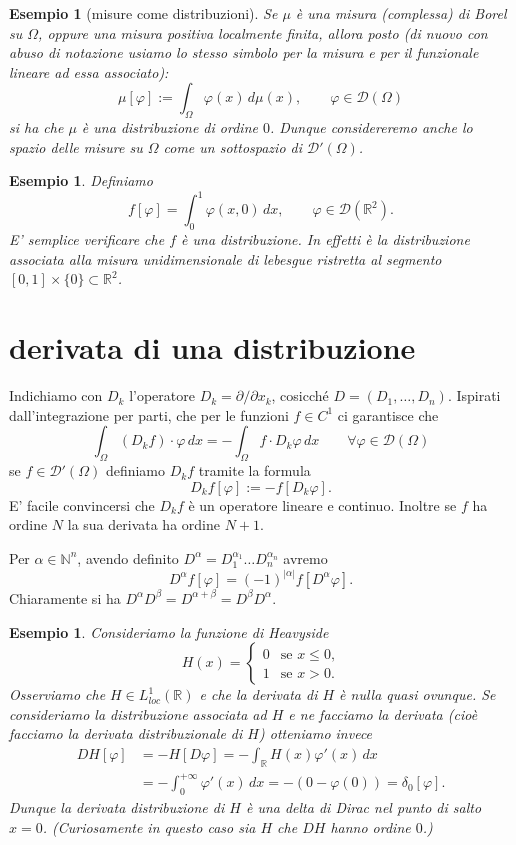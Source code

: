 \documentclass[italian,a4paper,oneside,headinclude]{scrbook}
\renewcommand{\phi}{\varphi}
\newcommand{\loc}{\mathit{loc}}
\newcommand{\D}{\mathcal D}
\newcommand{\NN}{\mathbb N}
\newcommand{\RR}{\mathbb R}
\newcommand{\abs}[1]{{\left|#1\right|}}
\newcommand{\defeq}{:=}
\newtheorem{example}[theorem]{Esempio}
\begin{document}
\begin{example}[misure come distribuzioni]
  Se $\mu$ è una misura (complessa) di Borel su $\Omega$, oppure una
  misura positiva localmente finita, allora posto (di nuovo con abuso
  di notazione usiamo lo stesso simbolo per la misura e per il
  funzionale lineare ad essa associato):
  \[
  \mu[\phi] \defeq \int_\Omega \phi(x)\, d\mu(x), \qquad \phi\in\D(\Omega)
  \]
  si ha che $\mu$ è una distribuzione di ordine $0$. Dunque
  considereremo anche lo spazio delle misure su $\Omega$
  come un sottospazio di $\D'(\Omega)$.
\end{example}


\begin{example}
  Definiamo
  \[
  f[\phi] = \int_0^1 \phi(x,0)\, dx, \qquad \phi\in\D(\RR^2).
  \]
  E' semplice verificare che $f$ è una distribuzione. In effetti è la
  distribuzione associata alla misura unidimensionale di lebesgue
  ristretta al segmento $[0,1]\times\{0\}\subset \RR^2$.
\end{example}

\section{derivata di una distribuzione}
Indichiamo con $D_k$ l'operatore $D_k=\partial / \partial x_k$,
cosicché $D=(D_1, \dots, D_n)$.
Ispirati dall'integrazione per parti, che per le funzioni $f\in C^1$ ci garantisce che
\[
\int_\Omega (D_k f) \cdot \phi\, dx
= - \int_\Omega f \cdot D_k \phi \, dx
\qquad \forall\phi\in\D(\Omega)
\]
se $f\in \D'(\Omega)$ definiamo $D_k f$ tramite la formula
\[
D_k f [\phi] \defeq -f[D_k\phi].
\]
E' facile convincersi che $D_k f$ è un operatore
lineare e continuo.
Inoltre se $f$ ha ordine $N$ la sua derivata ha
ordine $N+1$.

Per $\alpha \in \NN^n$, avendo definito $D^\alpha =
D_1^{\alpha_1}\dots D_n^{\alpha_n}$ avremo
\[
D^\alpha f[\phi] = (-1)^{\abs{\alpha}} f[D^\alpha \phi].
\]
Chiaramente si ha $D^\alpha D^\beta = D^{\alpha+\beta} = D^\beta D^\alpha$.

\begin{example}
  Consideriamo la funzione di \emph{Heavyside}
  \[
  H(x) =
  \begin{cases}
    0 & \text{se $x\le 0$,}\\
    1 & \text{se $x>0$.}
  \end{cases}
  \]
  Osserviamo che $H\in L^1_\loc(\RR)$ e che la derivata di $H$ è
  nulla quasi ovunque. Se consideriamo la distribuzione
  associata ad
  $H$ e ne
  facciamo la derivata (cioè facciamo la derivata distribuzionale di
  $H$) otteniamo invece
  \begin{align*}
    DH[\phi] &= - H[D\phi]
    = - \int_\RR H(x) \phi'(x)\, dx \\
    &= - \int_{0}^{+\infty} \phi'(x)\, dx = - (0 - \phi(0)) = \delta_0[\phi].
  \end{align*}
  Dunque la derivata distribuzione di $H$ è una delta di Dirac nel
  punto di salto $x=0$. (Curiosamente in questo caso sia $H$
  che $DH$ hanno ordine $0$.)
\end{example}
\end{document}
